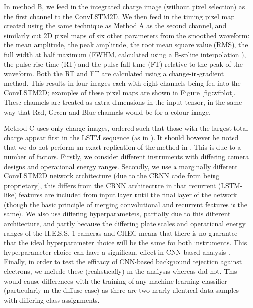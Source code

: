 In method B, we feed in the integrated charge image (without pixel selection) as the first channel to the ConvLSTM2D. We then feed in the timing pixel map created using the same technique as Method A as the second channel, and similarly cut 2D pixel maps of six other parameters from the smoothed waveform: the mean amplitude, the peak amplitude, the root mean square value (RMS), the full width at half maximum (FWHM, calculated using a B-spline interpolation \cite{scipy}), the pulse rise time (RT) and the pulse fall time (FT) relative to the peak of the waveform. Both the RT and FT are calculated using a change-in-gradient method. This results in four images each with eight channels being fed into the ConvLSTM2D; examples of these pixel maps are shown in Figure \ref{fig:wfplot}. These channels are treated as extra dimensions in the input tensor, in the same way that Red, Green and Blue channels would be for a colour image.

Method C uses only charge images, ordered such that those with the largest total charge appear first in the LSTM sequence (as in \cite{Shilon}). It should however be noted that we do not perform an exact replication of the method in \cite{Shilon}. This is due to a number of factors. Firstly, we consider different instruments with differing camera designs and operational energy ranges. Secondly, we use a marginally different ConvLSTM2D network architecture (due to the CRNN code from \cite{Shilon} being proprietary), this differs from the CRNN architecture in that recurrent (LSTM-like) features are included from input layer until the final layer of the network (though the basic principle of merging convolutional and recurrent features is the same). We also use differing hyperparameters, partially due to this different architecture, and partly because the differing plate scales and operational energy ranges of the H.E.S.S.-1 cameras and CHEC means that there is no guarantee that the ideal hyperparameter choice will be the same for both instruments. This hyperparameter choice can have a significant effect in CNN-based analysis \cite{hyperopt}. Finally, in order to test the efficacy of CNN-based background rejection against electrons, we include these (realistically) in the analysis whereas \cite{Shilon} did not. This would cause differences with the training of any machine learning classifier (particularly in the diffuse case) as there are two nearly identical data samples with differing class assignments.

